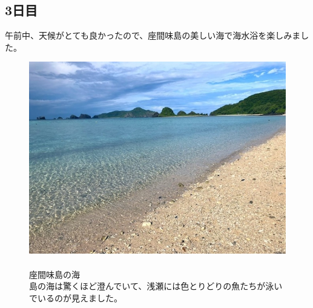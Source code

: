 \documentclass[../main]{subfiles}
\begin{document}
\subsection{3日目}
午前中、天候がとても良かったので、座間味島の美しい海で海水浴を楽しみました。
\begin{figure}[H]
  \begin{minipage}[b]{0.48\columnwidth}
    \centering
    \includegraphics[width=\columnwidth]{figure/tikaiumi.JPG}
  \end{minipage}
  \hspace{0.04\columnwidth} %
  \begin{minipage}[b]{0.48\columnwidth}
    \caption{\\
    座間味島の海\\
    島の海は驚くほど澄んでいて、浅瀬には色とりどりの魚たちが泳いでいるのが見えました。
    }
  \end{minipage}
\end{figure}
\end{document}
